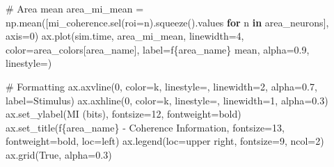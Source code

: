 \documentclass[
  11pt,
  letterpaper,
  oneside,
  openany]{book}
\newenvironment{Shaded}{\begin{snugshade}}{\end{snugshade}}
\newcommand{\CommentTok}[1]{\textcolor[rgb]{0.37,0.37,0.37}{#1}}
\newcommand{\ControlFlowTok}[1]{\textcolor[rgb]{0.00,0.23,0.31}{\textbf{#1}}}
\newcommand{\DecValTok}[1]{\textcolor[rgb]{0.68,0.00,0.00}{#1}}
\newcommand{\FloatTok}[1]{\textcolor[rgb]{0.68,0.00,0.00}{#1}}
\newcommand{\KeywordTok}[1]{\textcolor[rgb]{0.00,0.23,0.31}{\textbf{#1}}}
\newcommand{\NormalTok}[1]{\textcolor[rgb]{0.00,0.23,0.31}{#1}}
\newcommand{\OperatorTok}[1]{\textcolor[rgb]{0.37,0.37,0.37}{#1}}
\newcommand{\SpecialCharTok}[1]{\textcolor[rgb]{0.37,0.37,0.37}{#1}}
\newcommand{\SpecialStringTok}[1]{\textcolor[rgb]{0.13,0.47,0.30}{#1}}
\newcommand{\StringTok}[1]{\textcolor[rgb]{0.13,0.47,0.30}{#1}}
\newcommand{\VariableTok}[1]{\textcolor[rgb]{0.07,0.07,0.07}{#1}}
\begin{document}
\begin{Shaded}
\begin{Highlighting}[]
    \CommentTok{\# Area mean}
\NormalTok{    area\_mi\_mean }\OperatorTok{=}\NormalTok{ np.mean([mi\_coherence.sel(roi}\OperatorTok{=}\NormalTok{n).squeeze().values }
                           \ControlFlowTok{for}\NormalTok{ n }\KeywordTok{in}\NormalTok{ area\_neurons], axis}\OperatorTok{=}\DecValTok{0}\NormalTok{)}
\NormalTok{    ax.plot(sim.time, area\_mi\_mean, linewidth}\OperatorTok{=}\DecValTok{4}\NormalTok{, color}\OperatorTok{=}\NormalTok{area\_colors[area\_name],}
\NormalTok{           label}\OperatorTok{=}\SpecialStringTok{f\textquotesingle{}}\SpecialCharTok{\{}\NormalTok{area\_name}\SpecialCharTok{\}}\SpecialStringTok{ mean\textquotesingle{}}\NormalTok{, alpha}\OperatorTok{=}\FloatTok{0.9}\NormalTok{, linestyle}\OperatorTok{=}\StringTok{\textquotesingle{}{-}{-}\textquotesingle{}}\NormalTok{)}
    
    \CommentTok{\# Formatting}
\NormalTok{    ax.axvline(}\DecValTok{0}\NormalTok{, color}\OperatorTok{=}\StringTok{\textquotesingle{}k\textquotesingle{}}\NormalTok{, linestyle}\OperatorTok{=}\StringTok{\textquotesingle{}{-}{-}\textquotesingle{}}\NormalTok{, linewidth}\OperatorTok{=}\DecValTok{2}\NormalTok{, alpha}\OperatorTok{=}\FloatTok{0.7}\NormalTok{, label}\OperatorTok{=}\StringTok{\textquotesingle{}Stimulus\textquotesingle{}}\NormalTok{)}
\NormalTok{    ax.axhline(}\DecValTok{0}\NormalTok{, color}\OperatorTok{=}\StringTok{\textquotesingle{}k\textquotesingle{}}\NormalTok{, linestyle}\OperatorTok{=}\StringTok{\textquotesingle{}{-}\textquotesingle{}}\NormalTok{, linewidth}\OperatorTok{=}\DecValTok{1}\NormalTok{, alpha}\OperatorTok{=}\FloatTok{0.3}\NormalTok{)}
\NormalTok{    ax.set\_ylabel(}\StringTok{\textquotesingle{}MI (bits)\textquotesingle{}}\NormalTok{, fontsize}\OperatorTok{=}\DecValTok{12}\NormalTok{, fontweight}\OperatorTok{=}\StringTok{\textquotesingle{}bold\textquotesingle{}}\NormalTok{)}
\NormalTok{    ax.set\_title(}\SpecialStringTok{f\textquotesingle{}}\SpecialCharTok{\{}\NormalTok{area\_name}\SpecialCharTok{\}}\SpecialStringTok{ {-} Coherence Information\textquotesingle{}}\NormalTok{, }
\NormalTok{                fontsize}\OperatorTok{=}\DecValTok{13}\NormalTok{, fontweight}\OperatorTok{=}\StringTok{\textquotesingle{}bold\textquotesingle{}}\NormalTok{, loc}\OperatorTok{=}\StringTok{\textquotesingle{}left\textquotesingle{}}\NormalTok{)}
\NormalTok{    ax.legend(loc}\OperatorTok{=}\StringTok{\textquotesingle{}upper right\textquotesingle{}}\NormalTok{, fontsize}\OperatorTok{=}\DecValTok{9}\NormalTok{, ncol}\OperatorTok{=}\DecValTok{2}\NormalTok{)}
\NormalTok{    ax.grid(}\VariableTok{True}\NormalTok{, alpha}\OperatorTok{=}\FloatTok{0.3}\NormalTok{)}
    

\end{Highlighting}
\end{Shaded}
\end{document}
